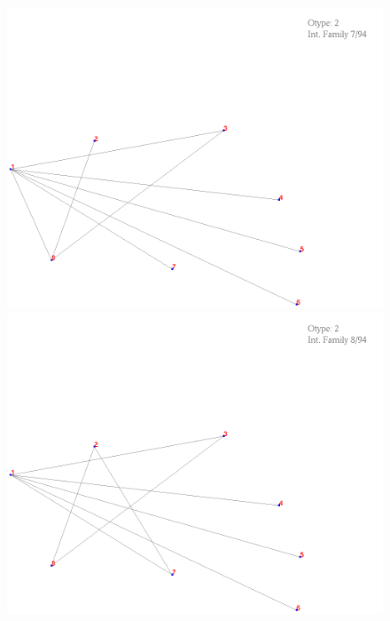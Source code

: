 \documentclass[11pt,epsf,times,letterpaper]{article}
\begin{document}
	
	\begin{figure}
		\includegraphics[scale=.4]{if_tam0_tam1/1.png}
		\includegraphics[scale=.4]{if_tam0_tam1/2.png}
	\end{figure}
\end{document}
